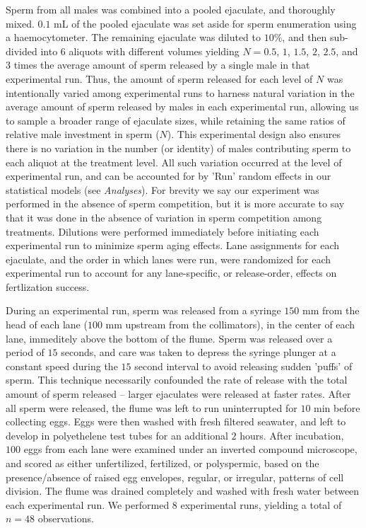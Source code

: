 \documentclass{article}
\begin{document}
	Sperm from all males was combined into a pooled ejaculate, and thoroughly mixed. $0.1$ mL of the pooled ejaculate was set aside for sperm enumeration using a haemocytometer. The remaining ejaculate was diluted to $10$\%, and then sub-divided into $6$ aliquots with different volumes yielding $N = 0.5$, $1$, $1.5$, $2$, $2.5$, and $3$ times the average amount of sperm released by a single male in that experimental run. Thus, the amount of sperm released for each level of $N$ was intentionally varied among experimental runs to harness natural variation in the average amount of sperm released by males in each experimental run, allowing us to sample a broader range of ejaculate sizes, while retaining the same ratios of relative male investment in sperm ($N$). This experimental design also ensures there is no variation in the number (or identity) of males contributing sperm to each aliquot at the treatment level. All such variation occurred at the level of experimental run, and can be accounted for by 'Run' random effects in our statistical models (see \textit{Analyses}). For brevity we say our experiment was performed in the absence of sperm competition, but it is more accurate to say that it was done in the absence of variation in sperm competition among treatments. Dilutions were performed immediately before initiating each experimental run to minimize sperm aging effects. Lane assignments for each ejaculate, and the order in which lanes were run, were randomized for each experimental run to account for any lane-specific, or release-order, effects on fertlization success.

	During an experimental run, sperm was released from a syringe $150$ mm from the head of each lane ($100$ mm upstream from the collimators), in the center of each lane, immeditely above the bottom of the flume. Sperm was released over a period of $15$ seconds, and care was taken to depress the syringe plunger at a constant speed during the $15$ second interval to avoid releasing sudden 'puffs' of sperm. This technique necessarily confounded the rate of release with the total amount of sperm released -- larger ejaculates were released at faster rates. After all sperm were released, the flume was left to run uninterrupted for $10$ min before collecting eggs. Eggs were then washed with fresh filtered seawater, and left to develop in polyethelene test tubes for an additional $2$ hours. After incubation, $100$ eggs from each lane were examined under an inverted compound microscope, and scored as either unfertilized, fertilized, or polyspermic, based on the presence/absence of raised egg envelopes, regular, or irregular, patterns of cell division. The flume was drained completely and washed with fresh water between each experimental run. We performed $8$ experimental runs, yielding a total of $n=48$ observations.
\end{document}
